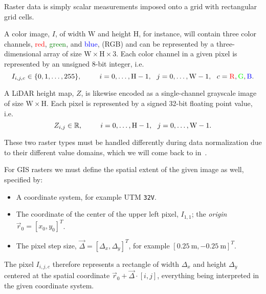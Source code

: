 Raster data is simply scalar measurements imposed onto a grid with rectangular grid cells.

A color image, $I$, of width $\mathrm{W}$ and height $\mathrm{H}$, for instance, will contain three color channels,
\textcolor{red}{red}, \textcolor{green}{green}, and \textcolor{blue}{blue}, (RGB)
and can be represented by a three-dimensional array of size $\mathrm{W} \times \mathrm{H} \times \mathrm{3}$.
Each color channel in a given pixel is represented by an unsigned 8-bit integer, i.e.
\begin{equation*}
  I_{i, j, c} \in \{0, 1, \ldots, 255\},
  \hspace{2.5em}
  i = 0, \ldots, \mathrm{H} - 1,
  ~~
  j = 0, \ldots, \mathrm{W} - 1,
  ~~
  c = \mathrm{\textcolor{red}{R}, \textcolor{green}{G},\textcolor{blue}{B}}.
\end{equation*}

A LiDAR height map, $Z$, is likewise encoded as a single-channel grayscale image of size $\mathrm{W} \times \mathrm{H}$.
Each pixel is represented by a signed 32-bit floating point value, i.e.
\begin{equation*}
  Z_{i, j} \in \mathbb{R},
  \hspace{2.5em}
  i = 0, \ldots, \mathrm{H} - 1,
  ~~
  j = 0, \ldots, \mathrm{W} - 1.
\end{equation*}

These two raster types must be handled differently during data normalization due to their different value domains, which we will come back to in~.

\begin{minipage}{\textwidth}
  For GIS rasters we must define the spatial extent of the given image as well, specified by:
  \begin{itemize}[noitemsep]
    \item A coordinate system, for example UTM \texttt{32V}.
    \item The coordinate of the center of the upper left pixel, $I_{1, 1}$; the \textit{origin} $\vec{r}_0 = {[x_0, y_0]}^T$.
    \item The pixel step size, $\vec{\Delta} = {[\Delta_x, \Delta_y]}^T$, for example ${[\SI{0.25}{\meter}, \SI{-0.25}{\meter}]}^T$.
  \end{itemize}
\end{minipage}
\vspace{0.5em}

The pixel $I_{i, j, c}$ therefore represents a rectangle of width $\Delta_x$ and height $\Delta_y$ centered at the spatial coordinate $\vec{r}_0 + \vec{\Delta} \cdot [i, j]$, everything being interpreted in the given coordinate system.

